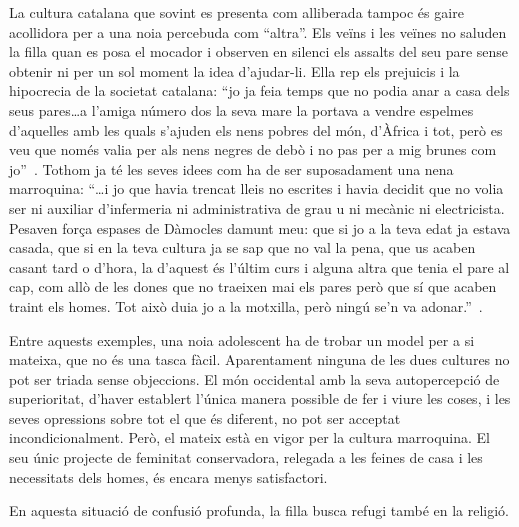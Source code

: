 La cultura catalana que sovint es presenta com alliberada tampoc és gaire acollidora per a una noia percebuda com ``altra''.
Els veïns i les veïnes no saluden la filla quan es posa el mocador i observen en silenci els assalts del seu pare sense obtenir ni per un sol moment la idea d'ajudar-li.
Ella rep els prejuicis i la hipocrecia de la societat catalana:
``jo ja feia temps que no podia anar a casa dels seus pares\ldots a l'amiga número dos la seva mare la portava a vendre espelmes d'aquelles amb les quals s'ajuden els nens pobres del món, d'Àfrica i tot, però es veu que només valia per als nens negres de debò i no pas per a mig brunes com jo''~\autocite[285]{ElHachmi2008}.
Tothom ja té les seves idees com ha de ser suposadament una nena marroquina:
``\ldots i jo que havia trencat lleis no escrites i havia decidit que no volia ser ni auxiliar d'infermeria ni administrativa de grau u ni mecànic ni electricista.
  Pesaven força espases de Dàmocles damunt meu: que si jo a la teva edat ja estava casada, que si en la teva cultura ja se sap que no val la pena, que us acaben casant tard o d'hora, la d'aquest és l'últim curs i alguna altra que tenia el pare al cap, com allò de les dones que no traeixen mai els pares però que sí que acaben traint els homes.
  Tot això duia jo a la motxilla, però ningú se'n va adonar.''~\autocite[273]{ElHachmi2008}.

Entre aquests exemples, una noia adolescent ha de trobar un model per a si mateixa, que no és una tasca fàcil.
Aparentament ninguna de les dues cultures no pot ser triada sense objeccions.
El món occidental amb la seva autopercepció de superioritat, d'haver establert l'única manera possible de fer i viure les coses, i les seves opressions sobre tot el que és diferent, no pot ser acceptat incondicionalment.
Però, el mateix està en vigor per la cultura marroquina.
El seu únic projecte de feminitat conservadora, relegada a les feines de casa i les necessitats dels homes, és encara menys satisfactori.

En aquesta situació de confusió profunda, la filla busca refugi també en la religió.

\begin{comment}
  1) la cultura d'origen representada per
     * el pare
     * la mare
     * la família amb els avis i les tietes
     * els moros de Catalunya
  2) la cultura d'acollida, representada per
     * l'escola
     * les amigues
     * les amants del pare

+ stereotips mútuus de cada grup per l'altre
\end{comment}

